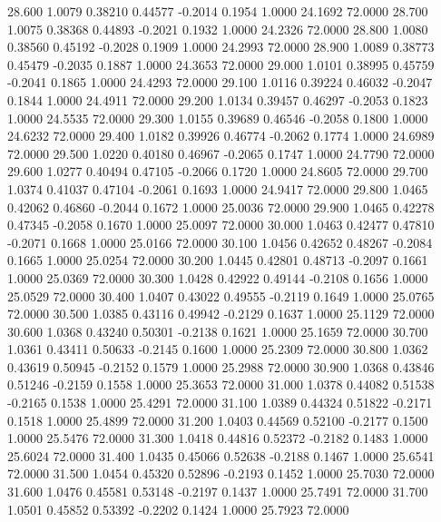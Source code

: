   28.600   1.0079   0.38210   0.44577  -0.2014   0.1954   1.0000  24.1692  72.0000
  28.700   1.0075   0.38368   0.44893  -0.2021   0.1932   1.0000  24.2326  72.0000
  28.800   1.0080   0.38560   0.45192  -0.2028   0.1909   1.0000  24.2993  72.0000
  28.900   1.0089   0.38773   0.45479  -0.2035   0.1887   1.0000  24.3653  72.0000
  29.000   1.0101   0.38995   0.45759  -0.2041   0.1865   1.0000  24.4293  72.0000
  29.100   1.0116   0.39224   0.46032  -0.2047   0.1844   1.0000  24.4911  72.0000
  29.200   1.0134   0.39457   0.46297  -0.2053   0.1823   1.0000  24.5535  72.0000
  29.300   1.0155   0.39689   0.46546  -0.2058   0.1800   1.0000  24.6232  72.0000
  29.400   1.0182   0.39926   0.46774  -0.2062   0.1774   1.0000  24.6989  72.0000
  29.500   1.0220   0.40180   0.46967  -0.2065   0.1747   1.0000  24.7790  72.0000
  29.600   1.0277   0.40494   0.47105  -0.2066   0.1720   1.0000  24.8605  72.0000
  29.700   1.0374   0.41037   0.47104  -0.2061   0.1693   1.0000  24.9417  72.0000
  29.800   1.0465   0.42062   0.46860  -0.2044   0.1672   1.0000  25.0036  72.0000
  29.900   1.0465   0.42278   0.47345  -0.2058   0.1670   1.0000  25.0097  72.0000
  30.000   1.0463   0.42477   0.47810  -0.2071   0.1668   1.0000  25.0166  72.0000
  30.100   1.0456   0.42652   0.48267  -0.2084   0.1665   1.0000  25.0254  72.0000
  30.200   1.0445   0.42801   0.48713  -0.2097   0.1661   1.0000  25.0369  72.0000
  30.300   1.0428   0.42922   0.49144  -0.2108   0.1656   1.0000  25.0529  72.0000
  30.400   1.0407   0.43022   0.49555  -0.2119   0.1649   1.0000  25.0765  72.0000
  30.500   1.0385   0.43116   0.49942  -0.2129   0.1637   1.0000  25.1129  72.0000
  30.600   1.0368   0.43240   0.50301  -0.2138   0.1621   1.0000  25.1659  72.0000
  30.700   1.0361   0.43411   0.50633  -0.2145   0.1600   1.0000  25.2309  72.0000
  30.800   1.0362   0.43619   0.50945  -0.2152   0.1579   1.0000  25.2988  72.0000
  30.900   1.0368   0.43846   0.51246  -0.2159   0.1558   1.0000  25.3653  72.0000
  31.000   1.0378   0.44082   0.51538  -0.2165   0.1538   1.0000  25.4291  72.0000
  31.100   1.0389   0.44324   0.51822  -0.2171   0.1518   1.0000  25.4899  72.0000
  31.200   1.0403   0.44569   0.52100  -0.2177   0.1500   1.0000  25.5476  72.0000
  31.300   1.0418   0.44816   0.52372  -0.2182   0.1483   1.0000  25.6024  72.0000
  31.400   1.0435   0.45066   0.52638  -0.2188   0.1467   1.0000  25.6541  72.0000
  31.500   1.0454   0.45320   0.52896  -0.2193   0.1452   1.0000  25.7030  72.0000
  31.600   1.0476   0.45581   0.53148  -0.2197   0.1437   1.0000  25.7491  72.0000
  31.700   1.0501   0.45852   0.53392  -0.2202   0.1424   1.0000  25.7923  72.0000
